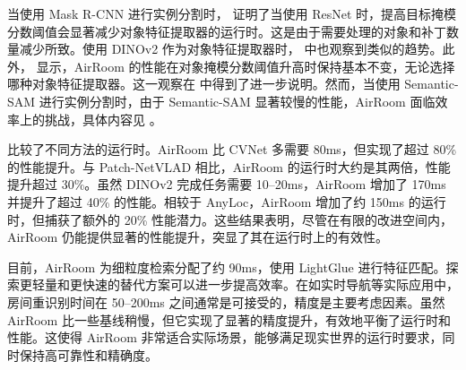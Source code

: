 当使用 Mask R-CNN 进行实例分割时， 证明了当使用 ResNet 时，提高目标掩模分数阈值会显著减少对象特征提取器的运行时。这是由于需要处理的对象和补丁数量减少所致。使用 DINOv2 作为对象特征提取器时， 中也观察到类似的趋势。此外， 显示，AirRoom 的性能在对象掩模分数阈值升高时保持基本不变，无论选择哪种对象特征提取器。这一观察在  中得到了进一步说明。然而，当使用 Semantic-SAM 进行实例分割时，由于 Semantic-SAM 显著较慢的性能，AirRoom 面临效率上的挑战，具体内容见 。

 比较了不同方法的运行时。AirRoom 比 CVNet 多需要 80ms，但实现了超过 80\% 的性能提升。与 Patch-NetVLAD 相比，AirRoom 的运行时大约是其两倍，性能提升超过 30\%。虽然 DINOv2 完成任务需要 10–20ms，AirRoom 增加了 170ms 并提升了超过 40\% 的性能。相较于 AnyLoc，AirRoom 增加了约 150ms 的运行时，但捕获了额外的 20\% 性能潜力。这些结果表明，尽管在有限的改进空间内，AirRoom 仍能提供显著的性能提升，突显了其在运行时上的有效性。

目前，AirRoom 为细粒度检索分配了约 90ms，使用 LightGlue 进行特征匹配。探索更轻量和更快速的替代方案可以进一步提高效率。在如实时导航等实际应用中，房间重识别时间在 50–200ms 之间通常是可接受的，精度是主要考虑因素。虽然 AirRoom 比一些基线稍慢，但它实现了显著的精度提升，有效地平衡了运行时和性能。这使得 AirRoom 非常适合实际场景，能够满足现实世界的运行时要求，同时保持高可靠性和精确度。
